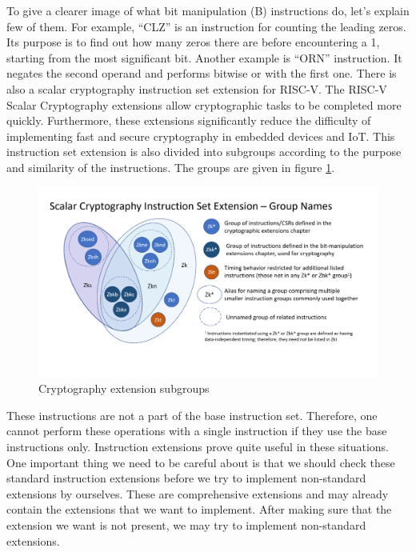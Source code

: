 To give a clearer image of what bit manipulation (B) instructions do, let’s explain few of them. For example, “CLZ” is an instruction for counting the leading zeros. Its purpose is to find out how many zeros there are before encountering a 1, starting from the most significant bit. Another example is “ORN” instruction. It negates the second operand and performs bitwise or with the first one. 
There is also a scalar cryptography instruction set extension for RISC-V. The RISC-V Scalar Cryptography extensions allow cryptographic tasks to be completed more quickly. Furthermore, these extensions significantly reduce the difficulty of implementing fast and secure cryptography in embedded devices and IoT. \cite{cryptogroups} This instruction set extension is also divided into subgroups according to the purpose and similarity of the instructions. The groups are given in figure \ref{fig:cryptography_extension_subgroups}.
\begin{figure}
    \centering
    \includegraphics{riscv/cryptography_extension_subgroups.png}
    \caption{Cryptography extension subgroups \cite{cryptogroupsdiag}}
    \label{fig:cryptography_extension_subgroups}
\end{figure}

These instructions are not a part of the base instruction set. Therefore, one cannot perform these operations with a single instruction if they use the base instructions only. Instruction extensions prove quite useful in these situations. One important thing we need to be careful about is that we should check these standard instruction extensions before we try to implement non-standard extensions by ourselves. These are comprehensive extensions and may already contain the extensions that we want to implement. After making sure that the extension we want is not present, we may try to implement non-standard extensions.
